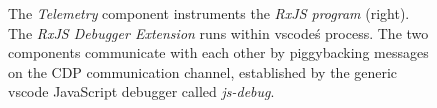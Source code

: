 \begin{figure}
  \caption{The \emph{Telemetry} component instruments the \emph{RxJS program} (right). The \emph{RxJS Debugger Extension} runs within vscode\'s process. The two components communicate with each other by piggybacking messages on the CDP communication channel, established by the generic vscode JavaScript debugger called \emph{js-debug}.}
  \label{fig:architecture}
\end{figure}
